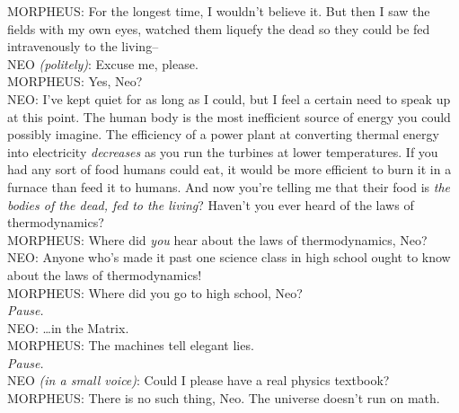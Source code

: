 \begin{playdialog}
MORPHEUS: For the longest time, I wouldn't believe it. But then I saw the fields with my own eyes, watched them liquefy the dead so they could be fed intravenously to the living\---\\

NEO \emph{(politely)}: Excuse me, please.\\

MORPHEUS: Yes, Neo?\\

NEO: I've kept quiet for as long as I could, but I feel a certain need to speak up at this point. The human body is the most inefficient source of energy you could possibly imagine. The efficiency of a power plant at converting thermal energy into electricity \emph{decreases} as you run the turbines at lower temperatures. If you had any sort of food humans could eat, it would be more efficient to burn it in a furnace than feed it to humans. And now you're telling me that their food is \emph{the bodies of the dead, fed to the living}? Haven't you ever heard of the laws of thermodynamics?\\

MORPHEUS: Where did \emph{you} hear about the laws of thermodynamics, Neo?\\

NEO: Anyone who's made it past one science class in high school ought to know about the laws of thermodynamics!\\

MORPHEUS: Where did you go to high school, Neo?\\

\emph{Pause.}\\

NEO: {\ldots}in the Matrix.\\

MORPHEUS: The machines tell elegant lies.\\

\emph{Pause.}\\

NEO \emph{(in a small voice)}: Could I please have a real physics textbook?\\

MORPHEUS: There is no such thing, Neo. The universe doesn't run on math.\\
\end{playdialog}

